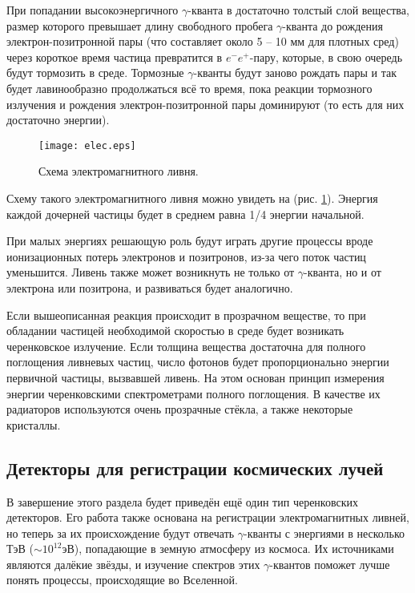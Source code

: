 \begin{main}
	При попадании высокоэнергичного $ \gamma $-кванта в достаточно толстый слой вещества, размер которого превышает длину свободного пробега $ \gamma $-кванта до рождения электрон-позитронной пары (что составляет около 5 -- 10 мм для плотных сред) через короткое время частица превратится в $e^-e^+$-пару, которые, в свою очередь будут тормозить в среде. 
	Тормозные $\gamma$-кванты будут заново рождать пары и так будет лавинообразно продолжаться всё то время, пока реакции тормозного излучения и рождения электрон-позитронной пары доминируют (то есть для них достаточно энергии).
	\begin{figure}
		\noindent
		\hfil
		\texttt{[image: elec.eps]}
		\hfil
		\caption{Схема электромагнитного ливня.}
		\label{emrain}
	\end{figure}
	
	Схему такого электромагнитного ливня можно увидеть на (рис. \ref{emrain}).
	Энергия каждой дочерней частицы будет в среднем равна 1/4 энергии начальной.
	
	При малых энергиях решающую роль будут играть другие процессы вроде ионизационных потерь электронов и позитронов, из-за чего поток частиц уменьшится.
	Ливень также может возникнуть не только от $ \gamma $-кванта, но и от электрона или позитрона, и развиваться будет аналогично.
	
	Если вышеописанная реакция происходит в прозрачном веществе, то при обладании частицей необходимой скоростью в среде будет возникать черенковское излучение. 
	Если толщина вещества достаточна для полного поглощения ливневых частиц, число фотонов будет пропорционально энергии первичной частицы, вызвавшей ливень. 
	На этом основан принцип измерения энергии черенковскими спектрометрами полного поглощения. 
	В качестве их радиаторов используются очень прозрачные стёкла, а также некоторые кристаллы. 
	\subsection{Детекторы для регистрации космических лучей}
	\label{sec:subsection}
	
	В завершение этого раздела будет приведён ещё один тип черенковских детекторов.
	Его работа также основана на регистрации электромагнитных ливней, но теперь за их происхождение будут отвечать $ \gamma $-кванты с энергиями в несколько ТэВ ($ \sim10^{12}  $эВ), попадающие в земную атмосферу из космоса.
	Их источниками являются далёкие звёзды, и изучение спектров этих $ \gamma $-квантов поможет лучше понять процессы, происходящие во Вселенной.
	

\end{main}
